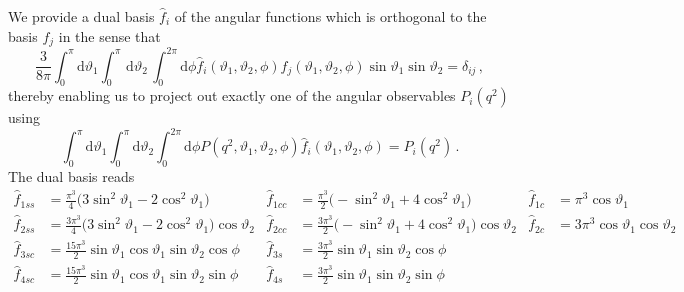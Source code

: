 \documentclass[aps,prd,reprint,nofootinbib,preprintnumbers]{revtex4}
\newcommand{\dd}{\text{d}}
\renewcommand{\theta}{\vartheta}
\begin{document}
We provide a dual basis $\hat{f}_i$ of the angular functions which is orthogonal to the basis $f_j$ in the sense that
\begin{equation}
    \frac{3}{8\pi}\int_0^\pi \dd\theta_1 \int_0^\pi\,\dd\theta_2\, \int_0^{2\pi}\dd \phi \hat{f}_i(\theta_1,\theta_2,\phi) f_j(\theta_1,\theta_2,\phi) \sin\theta_1 \sin\theta_2 = \delta_{ij}\,,
\end{equation}
thereby enabling us to project out exactly one of the angular observables $P_i(q^2)$ using
\begin{equation}
    \int_0^\pi \dd \theta_1 \int_0^\pi \dd \theta_2 \int_0^{2\pi} \dd \phi P(q^2, \theta_1, \theta_2, \phi) \hat{f}_i(\theta_1, \theta_2, \phi) = P_i(q^2)\,.
\end{equation}
The dual basis reads
\begin{equation}
    \begin{aligned}
        \hat f_{1ss} & = \frac{\pi^3}{4}\big(3 \sin^2\theta_1 - 2 \cos^2\theta_1\big) &
        \hat f_{1cc} & = \frac{\pi^3}{2}\big(- \sin^2\theta_1 + 4 \cos^2\theta_1\big) &
        \hat f_{1c}  & = \pi^3 \cos\theta_1\\
        \hat f_{2ss} & = \frac{3\pi^3}{4}\big(3 \sin^2\theta_1 - 2 \cos^2\theta_1\big) \cos\theta_2 &
        \hat f_{2cc} & = \frac{3\pi^3}{2}\big(- \sin^2\theta_1 + 4 \cos^2\theta_1\big) \cos\theta_2 &
        \hat f_{2c}  & = 3\pi^3 \cos\theta_1   \cos\theta_2 \\
        \hat f_{3sc} & = \frac{15\pi^3}{2}\sin\theta_1 \cos\theta_1 \sin\theta_2 \cos\phi &
        \hat f_{3s}  & = \frac{3\pi^3}{2} \sin\theta_1              \sin\theta_2 \cos\phi \\
        \hat f_{4sc} & = \frac{15\pi^3}{2}\sin\theta_1 \cos\theta_1 \sin\theta_2 \sin\phi &
        \hat f_{4s}  & = \frac{3\pi^3}{2} \sin\theta_1              \sin\theta_2 \sin\phi
    \end{aligned}
\end{equation}



\end{document}
